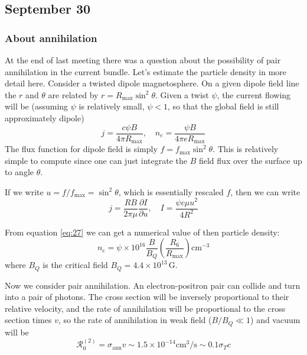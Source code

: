 \documentclass[letterpaper, 11pt]{article}
\numberwithin{equation}{section}
\numberwithin{figure}{section}
\begin{document}
\subsection{September 30}
\label{sec:sept-30}

\subsubsection{About annihilation}
\label{sec:annihilation}

At the end of last meeting there was a question about the possibility of pair annihilation in the current bundle. Let's estimate the particle density in more detail here. Consider a twisted dipole magnetosphere. On a given dipole field line the $r$ and $\theta$ are related by $r = R_\mathrm{max}\sin^2\theta$. Given a twist $\psi$, the current flowing will be (assuming $\psi$ is relatively small, $\psi < 1$, so that the global field is still approximately dipole)
\begin{equation}
    \label{eq:27}
    j = \frac{c\psi B}{4\pi R_\mathrm{max}},\quad n_e = \frac{\psi B}{4\pi e R_\mathrm{max}}
\end{equation}
The flux function for dipole field is simply $f = f_\mathrm{max}\sin^2\theta$. This is relatively simple to compute since one can just integrate the $B$ field flux over the surface up to angle $\theta$.

If we write $u = f/f_\mathrm{max} = \sin^2\theta$, which is essentially rescaled $f$, then we can write
\begin{equation}
    \label{eq:28}
    j = \frac{R B}{2\pi \mu} \frac{\partial I}{\partial u},\quad I = \frac{\psi c\mu u^2}{4R^2}
\end{equation}

From equation \eqref{eq:27} we can get a numerical value of then particle density:
\begin{equation}
    \label{eq:29}
    n_e = \psi \times 10^{16}\frac{B}{B_Q}\left( \frac{R_6}{R_\mathrm{max}} \right) \mathrm{cm}^{-3}
\end{equation}
where $B_Q$ is the critical field $B_Q = 4.4\times 10^{13}\,\mathrm{G}$.

Now we consider pair annihilation. An electron-positron pair can collide and turn into a pair of photons. The cross section will be inversely proportional to their relative velocity, and the rate of annihilation will be proportional to the cross section times $v$, so the rate of annihilation in weak field ($B/B_Q\ll 1$) and vacuum will be
\begin{equation}
    \label{eq:30}
    \mathcal{R}_{0}^{(2)} = \sigma_\mathrm{ann}v \sim 1.5\times 10^{-14} \mathrm{cm^3/s} \sim 0.1\sigma_Tc
\end{equation}
\end{document}
